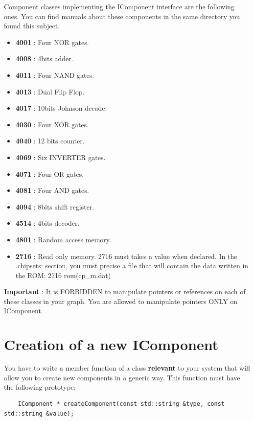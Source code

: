 \documentclass{koala-en}
\begin{document}
    Component classes implementing the IComponent interface are the following ones.
    You can find manuals about these components in the same directory you found
    this subject.\\

  \begin{itemize}
    \item \textbf{4001} : Four NOR gates.
    \item \textbf{4008} : 4bits adder.
    \item \textbf{4011} : Four NAND gates.
    \item \textbf{4013} : Dual Flip Flop.
    \item \textbf{4017} : 10bits Johnson decade.
    \item \textbf{4030} : Four XOR gates.
    \item \textbf{4040} : 12 bits counter.
    \item \textbf{4069} : Six INVERTER gates.
    \item \textbf{4071} : Four OR gates.
    \item \textbf{4081} : Four AND gates.
    \item \textbf{4094} : 8bits shift register.
    \item \textbf{4514} : 4bits decoder.
    \item \textbf{4801} : Random access memory.
    \item \textbf{2716} : Read only memory. 2716 must takes a value
      when declared. In the .chipsets: section,  you must
      precise a file that will contain the data written in the ROM:
      2716      rom(cp\_m.dat)
  \end{itemize}

  \warn
  {
	  \textbf{Important} : It is FORBIDDEN to manipulate pointers or
	  references on each of these classes in your graph. You are allowed to manipulate
          pointers ONLY on IComponent.
  }

\section{Creation of a new IComponent}

    You have to write a member function of a class \textbf{relevant} to your
  system that will allow you to create new components in a generic way. This
  function must have the following prototype:

  \begin{lstlisting}
    IComponent * createComponent(const std::string &type, const std::string &value);
  \end{lstlisting}
\end{document}
